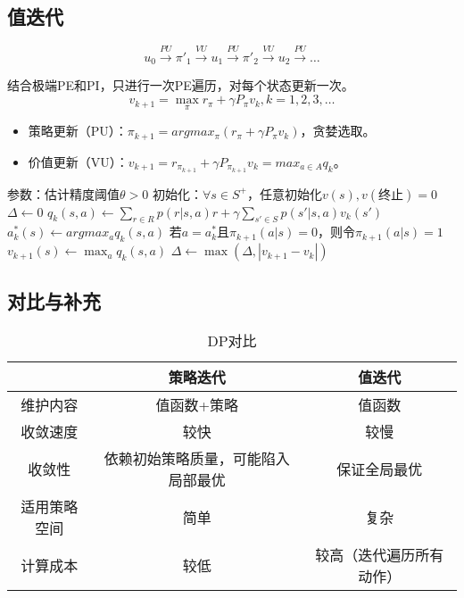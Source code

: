 \documentclass[
12pt, %
a4paper, 
oneside, %
headinclude,footinclude, %
]{scrartcl}
\begin{document}
\subsection[值迭代]{值迭代}
$$ u_0 \xrightarrow{PU} \pi'_1 \xrightarrow{VU} u_1 \xrightarrow{PU} \pi'_2 \xrightarrow{VU} u_2 \xrightarrow{PU} \dots $$

结合极端PE和PI，只进行一次PE遍历，对每个状态更新一次。
$$ v_{k + 1} = \max_{\pi} r_{\pi} + \gamma P_{\pi}v_k, k = 1, 2, 3, \dots $$
\begin{itemize}
\item 策略更新（PU）：$ \pi_{k + 1} = argmax_{\pi}(r_{\pi} + \gamma P_{\pi}v_k) $，贪婪选取。
\item 价值更新（VU）：$ v_{k + 1} = r_{\pi_{k + 1}} + \gamma P_{\pi_{k + 1}}v_k = max_{a \in A} q_k $。
\end{itemize}
\begin{myalgorithm}[值迭代]
\State 参数：估计精度阈值$ \theta > 0 $
\State 初始化：$ \forall s \in S^+ $，任意初始化$ v(s), v(\text{终止}) = 0 $
\Repeat
\State $ \Delta \gets 0 $
\State $ q_k(s, a) \gets \sum_{r \in R} p(r|s, a)r + \gamma \sum_{s' \in S} p(s'|s, a)v_k(s') $
\State $ a^*_k(s) \gets argmax_a q_k(s, a) $ 
\State 若$ a = a^*_k $且$ \pi_{k + 1}(a|s) = 0 $，则令$ \pi_{k + 1}(a|s) = 1 $ 
\State $ v_{k + 1}(s) \gets \max_a q_k(s, a) $ 
\State $ \Delta \gets \max(\Delta, |v_{k + 1} - v_k|) $ 
\EndFor
\EndFor
\Until{$ \Delta < \theta $}
\end{myalgorithm}
\subsection[对比与补充]{对比与补充}\label{sec:DP back}
\begin{table}[H]
\centering
\begin{tabular}{|c|c|c|}
\hline
& 策略迭代 & 值迭代 \\
\hline
维护内容 & 值函数+策略 & 值函数 \\
\hline
收敛速度 & 较快 & 较慢 \\
\hline
收敛性 & 依赖初始策略质量，可能陷入局部最优 & 保证全局最优 \\
\hline
适用策略空间 & 简单 & 复杂 \\
\hline
计算成本 & 较低 & 较高（迭代遍历所有动作） \\
\hline
\end{tabular}
\caption{DP对比}
\end{table}
\end{document}
